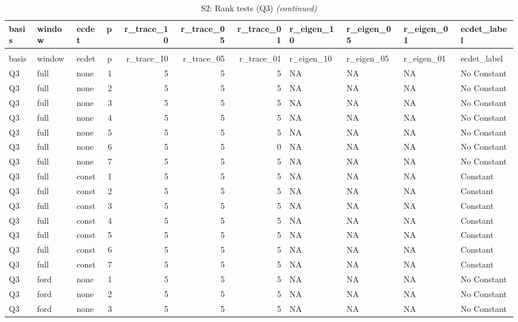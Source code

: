 \begingroup\fontsize{9}{11}\selectfont

\begin{longtable}[t]{lllrrrrllll}
\caption{\label{tab:tab:S2_rank_all_Q3}S2: Rank tests (Q3)}\\
\toprule
basis & window & ecdet & p & r\_trace\_10 & r\_trace\_05 & r\_trace\_01 & r\_eigen\_10 & r\_eigen\_05 & r\_eigen\_01 & ecdet\_label\\
\midrule
\endfirsthead
\caption[]{S2: Rank tests (Q3) \textit{(continued)}}\\
\toprule
basis & window & ecdet & p & r\_trace\_10 & r\_trace\_05 & r\_trace\_01 & r\_eigen\_10 & r\_eigen\_05 & r\_eigen\_01 & ecdet\_label\\
\midrule
\endhead

\endfoot
\bottomrule
\endlastfoot
Q3 & full & none & 1 & 5 & 5 & 5 & NA & NA & NA & No Constant\\
Q3 & full & none & 2 & 5 & 5 & 5 & NA & NA & NA & No Constant\\
Q3 & full & none & 3 & 5 & 5 & 5 & NA & NA & NA & No Constant\\
Q3 & full & none & 4 & 5 & 5 & 5 & NA & NA & NA & No Constant\\
Q3 & full & none & 5 & 5 & 5 & 5 & NA & NA & NA & No Constant\\
\addlinespace
Q3 & full & none & 6 & 5 & 5 & 0 & NA & NA & NA & No Constant\\
Q3 & full & none & 7 & 5 & 5 & 5 & NA & NA & NA & No Constant\\
Q3 & full & const & 1 & 5 & 5 & 5 & NA & NA & NA & Constant\\
Q3 & full & const & 2 & 5 & 5 & 5 & NA & NA & NA & Constant\\
Q3 & full & const & 3 & 5 & 5 & 5 & NA & NA & NA & Constant\\
\addlinespace
Q3 & full & const & 4 & 5 & 5 & 5 & NA & NA & NA & Constant\\
Q3 & full & const & 5 & 5 & 5 & 5 & NA & NA & NA & Constant\\
Q3 & full & const & 6 & 5 & 5 & 5 & NA & NA & NA & Constant\\
Q3 & full & const & 7 & 5 & 5 & 5 & NA & NA & NA & Constant\\
Q3 & ford & none & 1 & 5 & 5 & 5 & NA & NA & NA & No Constant\\
\addlinespace
Q3 & ford & none & 2 & 5 & 5 & 5 & NA & NA & NA & No Constant\\
Q3 & ford & none & 3 & 5 & 5 & 5 & NA & NA & NA & No Constant\\

\end{longtable}
